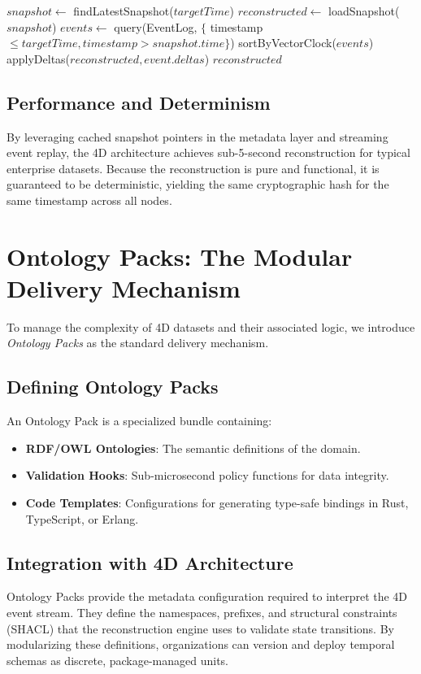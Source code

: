 \begin{algorithm}
\caption{Deterministic State Reconstruction}
\begin{algorithmic}
  \State $snapshot \gets$ findLatestSnapshot($targetTime$)
  \State $reconstructed \gets$ loadSnapshot($snapshot$)
  \State $events \gets$ query(EventLog, $\{$ timestamp $\leq targetTime, timestamp > snapshot.time \}$)
  \State sortByVectorClock($events$) 
  \State {}
    \State applyDeltas($reconstructed, event.deltas$)
  \EndFor
  \State \Return $reconstructed$
\end{algorithmic}
\end{algorithm}


\subsection{Performance and Determinism}
By leveraging cached snapshot pointers in the metadata layer and streaming event replay, the 4D architecture achieves sub-5-second reconstruction for typical enterprise datasets. Because the reconstruction is pure and functional, it is guaranteed to be deterministic, yielding the same cryptographic hash for the same timestamp across all nodes.

\section{Ontology Packs: The Modular Delivery Mechanism}

To manage the complexity of 4D datasets and their associated logic, we introduce \textit{Ontology Packs} as the standard delivery mechanism.

\subsection{Defining Ontology Packs}
An Ontology Pack is a specialized bundle containing:
\begin{itemize}
    \item \textbf{RDF/OWL Ontologies}: The semantic definitions of the domain.
    \item \textbf{Validation Hooks}: Sub-microsecond policy functions for data integrity.
    \item \textbf{Code Templates}: Configurations for generating type-safe bindings in Rust, TypeScript, or Erlang.
\end{itemize}

\subsection{Integration with 4D Architecture}
Ontology Packs provide the metadata configuration required to interpret the 4D event stream. They define the namespaces, prefixes, and structural constraints (SHACL) that the reconstruction engine uses to validate state transitions. By modularizing these definitions, organizations can version and deploy temporal schemas as discrete, package-managed units.

